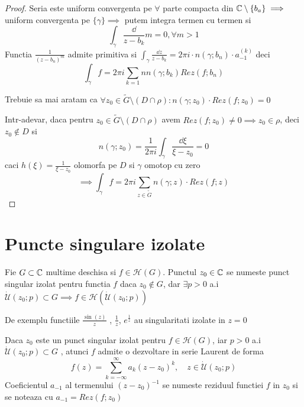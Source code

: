 \begin{theorem}
\begin{proof}
        Seria este uniform convergenta pe $\forall$ parte compacta din
        $\mathbb{C} \setminus \{b_a \} \implies$ uniform convergenta pe
        $\{ \gamma \} \implies$ putem integra termen cu termen si
        \[
            \int_{\gamma} \frac{\dd}{z-b_k} m = 0 , \forall m>1
        \]
        Functia $\displaystyle \frac{1}{(z-b_n)^m}$ admite primitiva si
        $\displaystyle
            \int_{\gamma} \frac{\dd z} {z - b_k} = 2 \pi i \cdot n(\gamma;b_n) \cdot a_{-1}^{(k)}
        $ deci
        \[
            \int_{\gamma} f = 2 \pi i \sum_{k=1}{n} n(\gamma; b_k) Rez(f;b_n)
        \]

        Trebuie sa mai aratam ca $\forall z_0 \in \widetilde{G} \setminus(D \cap \rho)
        \colon n(\gamma; z_0)\cdot Rez(f;z_0) = 0$

        Intr-adevar, daca pentru
        $z_0\in \widetilde{G} \setminus (D\cap\rho)$ avem
        $Rez(f;z_0) \neq 0 \implies z_0 \in \rho $, deci $z_0\notin D$ si
        \[
            n(\gamma;z_0) = \frac{1}{2 \pi i} \int_{\gamma}
            \frac{\dd \xi}{\xi - z_0} = 0
        \]
        caci $h(\xi) = \frac{1}{\xi - z_0}$ olomorfa pe $D$ si $\gamma$ omotop cu zero
        \[
            \implies \int_{\gamma} f = 2 \pi i \sum_{z\in \widetilde{G}} n(\gamma;z) \cdot Rez(f;z)
        \]

    \end{proof}
\end{theorem}

\section{Puncte singulare izolate}

\begin{definition}
    Fie $G\subset \mathbb{C}$ multime deschisa si $f\in\mathcal{H}(G)$. Punctul $z_0 \in \mathbb{C}$
    se numeste punct singular izolat pentru functia $f$ daca $z_0 \notin G$, dar
    $\exists p>0$ a.i
    $\mathcal{\dot{U}}(z_0;p)\subset G \implies f \in \mathcal{H}(\mathcal{\dot{U}}(z_0;p))$
\end{definition}

\begin{observation}
    De exemplu functiile $\frac{\sin(z)}{z}$ , $\frac{1}{z}$, $e^{\frac{1}{z}}$
    au singularitati izolate in $z=0$
\end{observation}

\begin{observation}
    Daca $z_0$ este un punct singular izolat pentru $f\in\mathcal{H}(G)$, iar
    $p>0$ a.i $\mathcal{\dot{U}}(z_0;p)\subset G$ , atunci $f$ admite o dezvoltare in
    serie Laurent de forma
    \[
        f(z) = \sum_{k=-\infty}^{\infty} a_{k}(z-z_0)^{k},\quad z\in \mathcal{\dot{U}}(z_0;p)
    \]
    Coeficientul $a_{-1}$ al termenului $(z-z_0)^{-1}$ se numeste reziduul functiei $f$
    in $z_0$ si se noteaza cu $a_{-1} = Rez(f;z_0)$
\end{observation}

